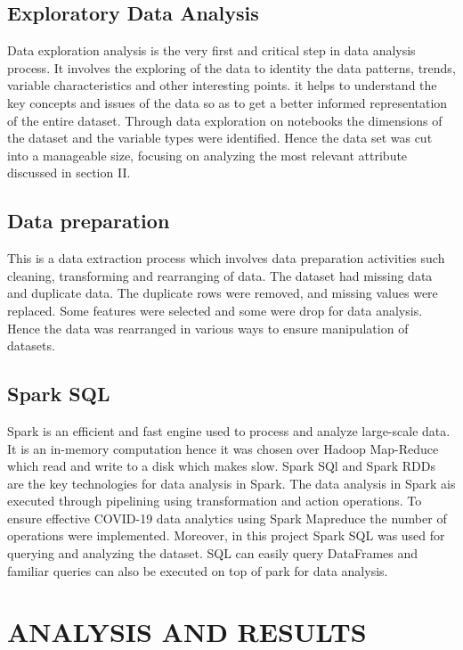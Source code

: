 \documentclass[12pt]{article}
\begin{document}
\subsection{ Exploratory Data Analysis}
Data exploration analysis is the very first and critical step in data analysis process. It involves the exploring of the data to identity the data patterns, trends, variable characteristics and other interesting points. it helps to understand the key concepts and issues of the data so as to get a better informed representation of the entire dataset. Through data exploration on notebooks the dimensions of the dataset and the variable types were identified. Hence the data set was cut into a manageable size, focusing on analyzing the most relevant attribute discussed in section II. 

\subsection{Data preparation}
 This is a data extraction process which involves data preparation activities such cleaning, transforming and rearranging of data. The dataset had missing data and duplicate data. The duplicate rows were removed, and missing values were replaced. Some features were selected and some were drop for data analysis. Hence the data was rearranged in various ways to ensure  manipulation of datasets. 


\subsection{Spark SQL}
Spark is an efficient and fast engine used to process and analyze large-scale data. It is an in-memory computation hence it was chosen over Hadoop Map-Reduce which read  and write to a disk which makes slow. Spark SQl and Spark RDDs are the key technologies for data analysis in Spark. The data analysis in Spark ais  executed through pipelining using transformation and action operations. To ensure effective COVID-19 data analytics using Spark Mapreduce the number of operations were implemented. Moreover, in this project Spark SQL was used for querying  and analyzing the dataset. SQL can easily  query DataFrames and familiar queries can also be executed on top of park for data analysis.

\section{ANALYSIS AND RESULTS}
\end{document}
